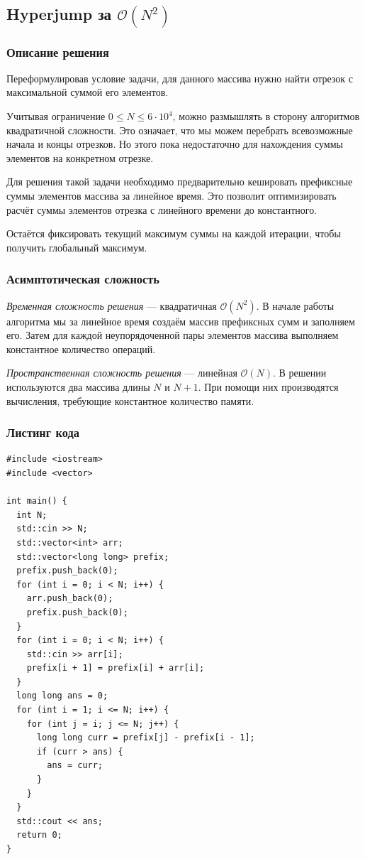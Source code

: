 \subsection{Hyperjump за \( \mathcal{O}(N^2) \)}

\subsubsection{Описание решения}

Переформулировав условие задачи, для данного массива нужно найти отрезок с максимальной суммой его элементов.

Учитывая ограничение \( 0\leq N\leq 6\cdot 10^4 \), можно размышлять в сторону алгоритмов квадратичной сложности. Это означает, что мы можем перебрать всевозможные начала и концы отрезков. Но этого пока недостаточно для нахождения суммы элементов на конкретном отрезке.

Для решения такой задачи необходимо предварительно кешировать префиксные суммы элементов массива за линейное время. Это позволит оптимизировать расчёт суммы элементов отрезка с линейного времени до константного.

Остаётся фиксировать текущий максимум суммы на каждой итерации, чтобы получить глобальный максимум.

\subsubsection{Асимптотическая сложность}

\textit{Временная сложность решения} --- квадратичная \( \mathcal{O}(N^2) \). В начале работы алгоритма мы за линейное время создаём массив префиксных сумм и заполняем его. Затем для каждой неупорядоченной пары элементов массива выполняем константное количество операций.

\textit{Пространственная сложность решения} --- линейная \( \mathcal{O}(N) \). В решении используются два массива длины \( N \) и \( N+1 \). При помощи них производятся вычисления, требующие константное количество памяти.

\subsubsection{Листинг кода}

\begin{lstlisting}
#include <iostream>
#include <vector>

int main() {
  int N;
  std::cin >> N;
  std::vector<int> arr;
  std::vector<long long> prefix;
  prefix.push_back(0);
  for (int i = 0; i < N; i++) {
    arr.push_back(0);
    prefix.push_back(0);
  }
  for (int i = 0; i < N; i++) {
    std::cin >> arr[i];
    prefix[i + 1] = prefix[i] + arr[i];
  }
  long long ans = 0;
  for (int i = 1; i <= N; i++) {
    for (int j = i; j <= N; j++) {
      long long curr = prefix[j] - prefix[i - 1];
      if (curr > ans) {
        ans = curr;
      }
    }
  }
  std::cout << ans;
  return 0;
}
\end{lstlisting}